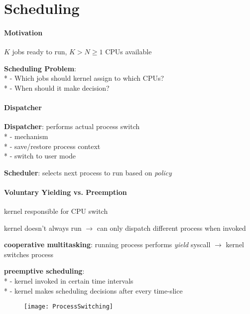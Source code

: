 \section{Scheduling}

\paragraph{Motivation}
\begin{items}
  \item \( K \) jobs ready to run, \( K > N \geq 1 \) CPUs available
  \item \textbf{Scheduling Problem}: \\*
    - Which jobs should kernel assign to which CPUs? \\*
    - When should it make decision?
\end{items}

\paragraph{Dispatcher}
\begin{items}
  \item \textbf{Dispatcher}: performs actual process switch \\*
    - mechanism \\*
    - save/restore process context \\*
    - switch to user mode
  \item \textbf{Scheduler}: selects next process to run based on \emph{policy}
\end{items}

\paragraph{Voluntary Yielding vs. Preemption}
\begin{items}
  \item kernel responsible for CPU switch
  \item kernel doesn't always run \( \to \) can only dispatch different process when invoked
  \item \textbf{cooperative multitasking}: running process performs \emph{yield} syscall \( \to \) kernel switches process
  \item \textbf{preemptive scheduling}: \\*
    - kernel invoked in certain time intervals \\*
    - kernel makes scheduling decisions after every time-slice
\end{items}
\begin{figure}[H]\centering\label{ProcessSwitching}\texttt{[image: ProcessSwitching]}\end{figure}

